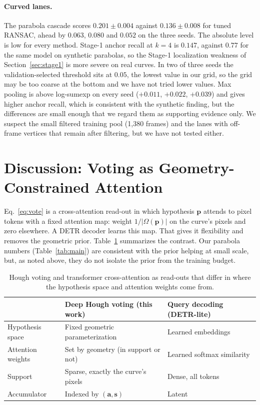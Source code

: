 \documentclass[11pt]{article}
\begin{document}
\paragraph{Curved lanes.} The parabola cascade scores $0.201\pm0.004$ against $0.136\pm0.008$ for tuned RANSAC, ahead by $0.063$, $0.080$ and $0.052$ on the three seeds. The absolute level is low for every method. Stage-1 anchor recall at $k=4$ is $0.147$, against $0.77$ for the same model on synthetic parabolas, so the Stage-1 localization weakness of Section~\ref{sec:stage1} is more severe on real curves. In two of three seeds the validation-selected threshold sits at $0.05$, the lowest value in our grid, so the grid may be too coarse at the bottom and we have not tried lower values. Max pooling is above log-sumexp on every seed ($+0.011$, $+0.022$, $+0.039$) and gives higher anchor recall, which is consistent with the synthetic finding, but the differences are small enough that we regard them as supporting evidence only. We suspect the small filtered training pool (1{,}380 frames) and the lanes with off-frame vertices that remain after filtering, but we have not tested either.

\section{Discussion: Voting as Geometry-Constrained Attention}
\label{sec:discussion}
Eq.~\ref{eq:vote} is a cross-attention read-out in which hypothesis $\mathbf{p}$ attends to pixel tokens with a fixed attention map: weight $1/|\Omega(\mathbf{p})|$ on the curve's pixels and zero elsewhere. A DETR decoder learns this map. That gives it flexibility and removes the geometric prior. Table~\ref{tab:attention_compare} summarizes the contrast. Our parabola numbers (Table~\ref{tab:main}) are consistent with the prior helping at small scale, but, as noted above, they do not isolate the prior from the training budget.

\begin{table}[t]
\centering
\caption{Hough voting and transformer cross-attention as read-outs that differ in where the hypothesis space and attention weights come from.}
\label{tab:attention_compare}
\small
\begin{tabularx}{\linewidth}{@{}l>{\raggedright\arraybackslash}X>{\raggedright\arraybackslash}X@{}}
\toprule
& \textbf{Deep Hough voting (this work)} & \textbf{Query decoding (DETR-lite)} \\
\midrule
Hypothesis space & Fixed geometric parameterization & Learned embeddings \\
Attention weights & Set by geometry (in support or not) & Learned softmax similarity \\
Support & Sparse, exactly the curve's pixels & Dense, all tokens \\
Accumulator & Indexed by $(\mathbf{a},\mathbf{s})$ & Latent \\
\bottomrule
\end{tabularx}
\end{table}
\end{document}
